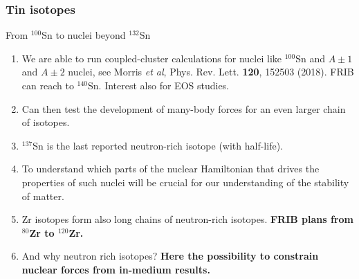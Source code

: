 \documentclass[compress]{beamer}
\begin{document}
\frame
{
  \frametitle{Tin isotopes}

  \begin{block}{From $^{100}$Sn to nuclei beyond $^{132}$Sn}
\begin{enumerate}
\item We are able to run coupled-cluster calculations
for nuclei like $^{100}$Sn and $A\pm 1$ and $A\pm 2$ nuclei, see Morris {\em et al}, Phys. Rev. Lett. {\bf 120}, 152503  (2018).
FRIB can reach to $^{140}$Sn. Interest also for EOS studies.
\item Can then test the development of many-body forces for an even larger chain of isotopes.
\item $^{137}$Sn is the last reported neutron-rich isotope (with half-life).
\item To understand which parts of the nuclear Hamiltonian that drives the
properties of such nuclei will be crucial for our understanding of the stability of matter.
\item Zr isotopes form also long chains of neutron-rich isotopes. {\bf FRIB plans from $^{80}$Zr to
$^{120}$Zr.}
\item And why neutron rich isotopes? {\bf Here the possibility to constrain nuclear forces from in-medium results.}
\end{enumerate}
  \end{block}
 }  
\end{document}

